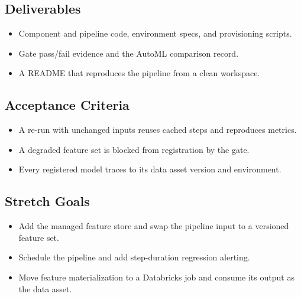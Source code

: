 \subsection*{Deliverables}
\begin{itemize}
    \item Component and pipeline code, environment specs, and provisioning scripts.
    \item Gate pass/fail evidence and the AutoML comparison record.
    \item A README that reproduces the pipeline from a clean workspace.
\end{itemize}

\subsection*{Acceptance Criteria}
\begin{itemize}
    \item A re-run with unchanged inputs reuses cached steps and reproduces metrics.
    \item A degraded feature set is blocked from registration by the gate.
    \item Every registered model traces to its data asset version and environment.
\end{itemize}

\subsection*{Stretch Goals}
\begin{itemize}
    \item Add the managed feature store and swap the pipeline input to a versioned feature set.
    \item Schedule the pipeline and add step-duration regression alerting.
    \item Move feature materialization to a Databricks job and consume its output as the data asset.
\end{itemize}
